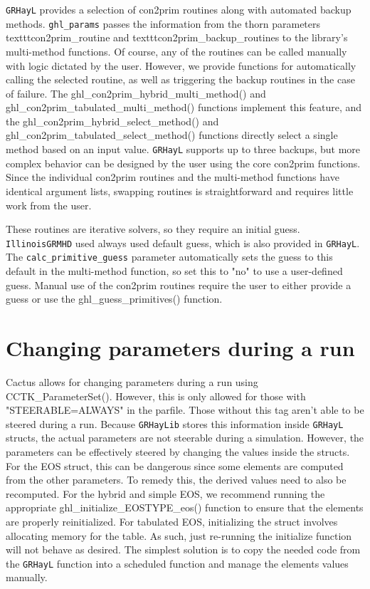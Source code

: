\documentclass{article}
\newcommand{\grhayl}{\texttt{GRHayL}\xspace}
\newcommand{\glib}{\texttt{GRHayLib}\xspace}
\newcommand{\igm}{\texttt{IllinoisGRMHD}\xspace}
\begin{document}
\grhayl provides a selection of con2prim routines along with automated
backup methods. \texttt{ghl\_params} passes the information from the
thorn parameters texttt{con2prim\_routine} and texttt{con2prim\_backup\_routines}
to the library's multi-method functions. Of course, any of the routines
can be called manually with logic dictated by the user. However, we
provide functions for automatically calling the selected routine,
as well as triggering the backup routines in the case of failure.
The ghl\_con2prim\_hybrid\_multi\_method() and
ghl\_con2prim\_tabulated\_multi\_method() functions implement this
feature, and the ghl\_con2prim\_hybrid\_select\_method() and
ghl\_con2prim\_tabulated\_select\_method() functions directly select
a single method based on an input value. \grhayl supports up to three
backups, but more complex behavior can be designed by the user using
the core con2prim functions. Since the individual con2prim routines
and the multi-method functions have identical argument lists, swapping
routines is straightforward and requires little work from the user.

These routines are iterative solvers, so they require an initial guess.
\igm used always used default guess, which is also provided in \grhayl.
The \texttt{calc\_primitive\_guess} parameter automatically sets the
guess to this default in the multi-method function, so set this to
"no" to use a user-defined guess. Manual use of the con2prim
routines require the user to either provide a guess or use the
ghl\_guess\_primitives() function.

\section{Changing parameters during a run}

Cactus allows for changing parameters during a run using CCTK\_ParameterSet().
However, this is only allowed for those with "STEERABLE=ALWAYS" in the parfile.
Those without this tag aren't able to be steered during a run. Because \glib
stores this information inside \grhayl structs, the actual parameters are not
steerable during a simulation. However, the parameters can be effectively steered
by changing the values inside the structs. For the EOS struct, this can be
dangerous since some elements are computed from the other parameters. To remedy
this, the derived values need to also be recomputed. For the hybrid and simple EOS,
we recommend running the appropriate ghl\_initialize\_EOSTYPE\_eos() function
to ensure that the elements are properly reinitialized. For tabulated EOS,
initializing the struct involves allocating memory for the table. As such,
just re-running the initialize function will not behave as desired. The simplest
solution is to copy the needed code from the \grhayl function into a scheduled
function and manage the elements values manually.

\end{document}
